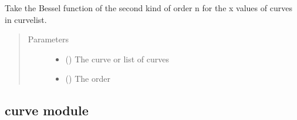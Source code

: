 \documentclass[letterpaper,10pt,english]{sphinxmanual}
\begin{document}

\begin{fulllineitems}
\label{\detokenize{pydv:pydvpy.ynx}}
Take the Bessel function of the second kind of order n for the x values of
curves in curvelist.
\begin{quote}\begin{description}
\item[{Parameters}] \leavevmode\begin{itemize}
\item {} 
 () \textendash{} The curve or list of curves

\item {} 
 () \textendash{} The order

\end{itemize}

\end{description}\end{quote}

\end{fulllineitems}



\subsection{curve module}
\label{\detokenize{pydv:module-curve}}\label{\detokenize{pydv:curve-module}}
\end{document}
